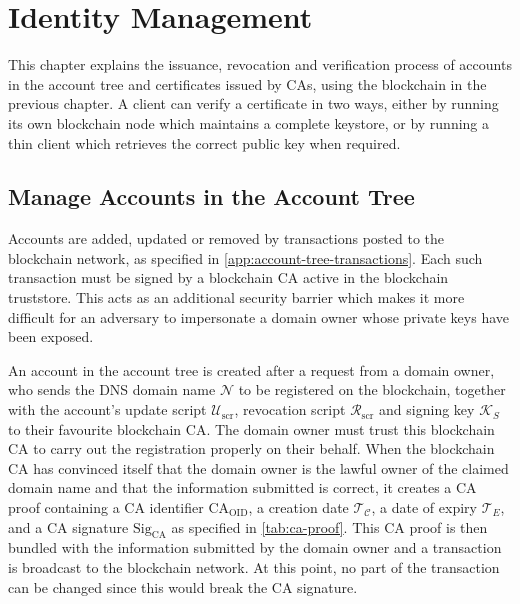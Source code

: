 \documentclass{style/kththesis}
\begin{document}
\chapter{Identity Management}
\label{chap:identity}
This chapter explains the issuance, revocation and verification process of accounts in the account tree and certificates issued by CAs, using the blockchain in the previous chapter. A client can verify a certificate in two ways, either by running its own blockchain node which maintains a complete keystore, or by running a thin client which retrieves the correct public key when required.

\section{Manage Accounts in the Account Tree}
Accounts are added, updated or removed by transactions posted to the blockchain network, as specified in \cref{app:account-tree-transactions}. Each such transaction must be signed by a blockchain CA active in the blockchain truststore. This acts as an additional security barrier which makes it more difficult for an adversary to impersonate a domain owner whose private keys have been exposed.

An account in the account tree is created after a request from a domain owner, who sends the DNS domain name $\mathcal{N}$ to be registered on the blockchain, together with the account's update script $\mathcal{U}_\text{scr}$, revocation script $\mathcal{R}_\text{scr}$ and signing key $\mathcal{K}_S$ to their favourite blockchain CA. The domain owner must trust this blockchain CA to carry out the registration properly on their behalf. When the blockchain CA has convinced itself that the domain owner is the lawful owner of the claimed domain name and that the information submitted is correct, it creates a CA proof containing a CA identifier $\text{CA}_\text{OID}$, a creation date $\mathcal{T_C}$, a date of expiry $\mathcal{T}_E$, and a CA signature $\text{Sig}_\text{CA}$ as specified in \cref{tab:ca-proof}. This CA proof is then bundled with the information submitted by the domain owner and a transaction is broadcast to the blockchain network. At this point, no part of the transaction can be changed since this would break the CA signature.
\end{document}
